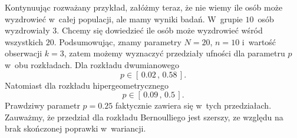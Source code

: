 Kontynuując rozważany przykład, załóżmy teraz, że nie wiemy ile osób może wyzdrowieć w~całej populacji, ale mamy wyniki badań. W~grupie $10$~osób wyzdrowiały $3$. Chcemy się dowiedzieć ile osób może wyzdrowieć wśród wszystkich $20$. Podsumowując, znamy parametry $N=20$, $n=10$ i~wartość obserwacji $k=3$, zatem możemy wyznaczyć przedziały ufności dla parametru $p$ w~obu rozkładach. Dla rozkładu dwumianowego
\begin{equation}
p\in \left[\, 0.02 \, , \, 0.58\, \right].
\end{equation}
Natomiast dla rozkładu hipergeometrycznego
\begin{equation}
p\in \left[\, 0.09 \, , \, 0.5\, \right].
\end{equation}
Prawdziwy parametr $p=0.25$ faktycznie zawiera się w~tych przedziałach. Zauważmy, że przedział dla rozkładu Bernoulliego jest szerszy, ze względu na brak skończonej poprawki w~wariancji.




